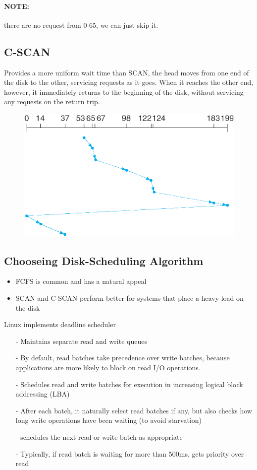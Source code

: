 \paragraph{NOTE: } there are no request from 0-65, we can just skip it.


\subsection{C-SCAN}
Provides a more uniform wait time than SCAN, the head moves from one end of the disk to the other, servicing
requests as it goes. When it reaches the other end, however, it immediately returns to
the beginning of the disk, without servicing any requests on the
return trip.


\begin{figure}[h!]
    \centering
    \includegraphics[width=0.5\linewidth]{img/Immagine 2024-05-22 184919.png}
\end{figure}

\newpage
\subsection{Chooseing Disk-Scheduling Algorithm }

\begin{itemize}
    \item FCFS is common and has a natural appeal
    \item SCAN and C-SCAN perform better for systems that place a heavy load on the disk
\end{itemize}

Linux implements deadline scheduler

\begin{itemize}
    \item[-] Maintains separate read and write queues
    \item[-] By default, read batches take precedence over write batches, because applications are more likely to block on read I/O operations.
    \item[-] Schedules read and write batches for execution in increasing logical block addressing (LBA)
    \item[-] After each batch, it naturally select read batches if any, but also checks how long write operations have been waiting (to avoid starvation)
    \item[-] schedules the next read or write batch as appropriate
    \item[-] Typically, if read batch is waiting for more than 500ms, gets priority over read
\end{itemize}

